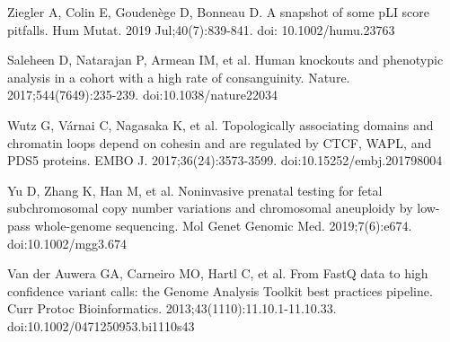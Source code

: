 \documentclass[a4paper,12pt]{article}
\begin{document}
\begin{thebibliography}{100}
Ziegler A, Colin E, Goudenège D, Bonneau D. A snapshot of some pLI score pitfalls. Hum Mutat. 2019 Jul;40(7):839-841. doi: 10.1002/humu.23763

Saleheen D, Natarajan P, Armean IM, et al. Human knockouts and phenotypic analysis in a cohort with a high rate of consanguinity. Nature. 2017;544(7649):235-239. doi:10.1038/nature22034

Wutz G, Várnai C, Nagasaka K, et al. Topologically associating domains and chromatin loops depend on cohesin and are regulated by CTCF, WAPL, and PDS5 proteins. EMBO J. 2017;36(24):3573-3599. doi:10.15252/embj.201798004

Yu D, Zhang K, Han M, et al. Noninvasive prenatal testing for fetal subchromosomal copy number variations and chromosomal aneuploidy by low-pass whole-genome sequencing. Mol Genet Genomic Med. 2019;7(6):e674. doi:10.1002/mgg3.674

Van der Auwera GA, Carneiro MO, Hartl C, et al. From FastQ data to high confidence variant calls: the Genome Analysis Toolkit best practices pipeline. Curr Protoc Bioinformatics. 2013;43(1110):11.10.1-11.10.33. doi:10.1002/0471250953.bi1110s43

\end{thebibliography}
\end{document}
